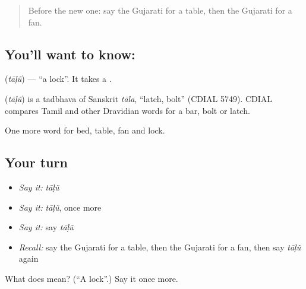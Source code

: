 \label{lesson:GU-C62-lock}



\begin{quote}
Before the new one: say the Gujarati for a table, then the Gujarati for a fan.
\end{quote}

\subsection*{You'll want to know: }
\textbf{} (\emph{tāḷũ}) — \textquotedblleft{}a lock\textquotedblright{}. It takes a \textbf{}.

\begin{cousinweb}
\textbf{} (\emph{tāḷũ}) is a tadbhava of Sanskrit \emph{tāla}, \textquotedblleft{}latch, bolt\textquotedblright{} (CDIAL 5749). CDIAL compares Tamil and other Dravidian words for a bar, bolt or latch.
\end{cousinweb}

\begin{grammarlens}[title={What you've built}]
One more word for bed, table, fan and lock.
\end{grammarlens}

\subsection*{Your turn}
\begin{itemize}
\raggedright
  \item \emph{Say it:} \emph{tāḷũ}
  \item \emph{Say it:} \emph{tāḷũ}, once more
  \item \emph{Say it:} say \emph{tāḷũ}
  \item \emph{Recall:} say the Gujarati for a table, then the Gujarati for a fan, then say \emph{tāḷũ} again
\end{itemize}

\begin{tcolorbox}[breakable,colback=teal!4,colframe=teal!35!black,title={Before you move on}]
What does  mean? (\textquotedblleft{}A lock\textquotedblright{}.) Say it once more.
\end{tcolorbox}
